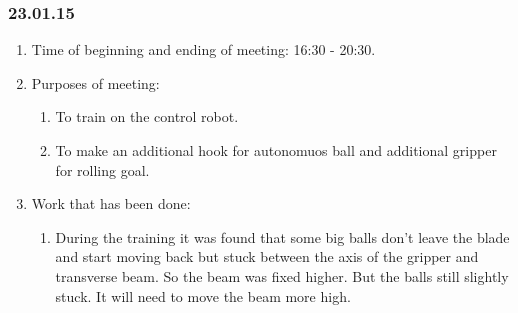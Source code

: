 \subsubsection{23.01.15}
\begin{enumerate}
	
	\item Time of beginning and ending of meeting: 16:30 - 20:30.
	
	\item Purposes of meeting: 
	\begin{enumerate}
		
		\item To train on the control robot.
		
		\item To make an additional hook for autonomuos ball and additional gripper for rolling goal.
		
	\end{enumerate}

	\item Work that has been done:
	\begin{enumerate}
		
		\item During the training it was found that some big balls don't leave the blade and start moving back but stuck between the axis of the gripper and transverse beam. So the beam was fixed higher. But the balls still slightly stuck. It will need to move the beam more high.
		

\end{enumerate}
\end{enumerate}
